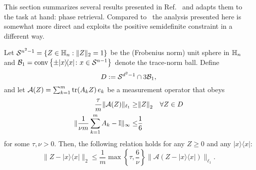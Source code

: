 This section summarizes several results presented in Ref.~\cite{kabanava_stable_2016} and adapts them to the task at hand: phase retrieval.
Compared to~\cite{kabanava_stable_2016} the analysis presented here is somewhat more direct and exploits the positive semidefinite constraint in a different way.

\begin{proposition} \label{prop:nsp_implication}
  Let $\mathcal{S}^{n^2-1}=\left\{  Z \in \mathbb{H}_n: \|  Z \|_2=1 \right\}$ be the (Frobenius norm) unit sphere in $\mathbb{H}_n$ and $\mathcal{B}_1 = \mathrm{conv} \left\{ \pm | x \rangle \! \langle  x| \colon  x \in \mathcal{S}^{n-1} \right\}$ denote the trace-norm ball.
  Define
  \begin{equation}
    D := \mathcal{S}^{d^2-1} \cap 3 \mathcal{B}_1, \label{eq:D}
  \end{equation}
  and let $\mathcal{A}( Z) = \sum_{k=1}^m \operatorname{tr} ( A_k  Z ) \,  e_k$ be a measurement operator that obeys
  \begin{align}
      \frac{ \tau}{m} \| \mathcal{A}( Z) \|_{\ell_1} \geq& {\Vert Z\Vert}_2 \quad \forall  Z \in D \label{eq:nsp}\\
      \| \frac{1}{\nu m}\sum_{k=1}^m  A_k -  \mathbb{I} \|_\infty \leq& \frac{1}{6}\label{eq:approx_povm}
  \end{align}
  for some $\tau,\nu >0$.
  Then, the following relation holds for any $ Z \geq 0$ and any $|{x} \rangle \! \langle {x}|$:
  \begin{equation}
    \|  Z - |{x} \rangle \! \langle {x}| \|_2 \leq \frac{1}{m} \max \left\{ \tau, \frac{6}{\nu} \right\}  \| \mathcal{A}( Z-|{x} \rangle \! \langle {x}|) \|_{\ell_1}. \label{eq:rec_guarantee}
  \end{equation}
\end{proposition}



